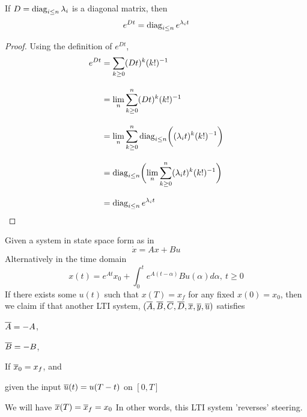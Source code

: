 \documentclass[../../main.tex]{subfiles}
\begin{document}
    \begin{lemma}\label{lemma: diagonal exponential matrix}
    If $D =\operatorname{diag}_{i\leq n}\lambda_i$ is a diagonal matrix, then 
    \[
    e^{Dt} = \operatorname{diag}_{i\leq n}e^{\lambda_i t}
    \]
\end{lemma}
\begin{proof}
    Using the definition of $e^{Dt}$,
    \begin{align*}
        e^{Dt}&= \sum_{k\geq 0} (Dt)^k(k!)^{-1}\\[2ex]
        &=\lim_n\sum^n_{k\geq 0}(Dt)^k(k!)^{-1}\\[2ex]
        &=\lim_n \sum^n_{k\geq 0}\operatorname{diag}_{i\leq n}\biggl( (\lambda_i t)^k(k!)^{-1}\biggr)\\[2ex]
        &=\operatorname{diag}_{i\leq n}\biggl(\lim_n \sum_{k\geq 0}^n (\lambda_it)^k(k!)^{-1}\biggr)\\[2ex]
        &=\operatorname{diag}_{i\leq n}e^{\lambda_i t}
    \end{align*}
\end{proof}
\begin{wts}
    Given a system in state space form as in
    \begin{equation}\label{state space equation q2}
        \dot{x} = Ax + Bu
    \end{equation}
    Alternatively in the time domain
    \begin{equation}\label{state space equation q2 time domain}
        x(t) = e^{At}x_0 + \int_0^t e^{A(t-\alpha)}Bu(\alpha)d\alpha,\: t\geq 0
    \end{equation}
    If there exists some $u(t)$ such that $x(T) = x_f$ for any fixed $x(0) = x_0$, then we claim if that another LTI system, $(\overline{A}, \overline{B}, \overline{C}, \overline{D}, \overline{x}, \overline{y}, \overline{u})$ satisfies
    \begin{enumroman}
        \item $\overline{A} = -A$,\label{q2 param1}
        \item $\overline{B} = -B$,\label{q2 param2}
        \item If $\overline{x}_0 = x_f$, and\label{q2 param3}
        \item given the input $\overline{u}(t)=u(T-t)$ on $[0, T]$\label{q2 param4}
    \end{enumroman}
    We will have $\overline{x}(T) = \overline{x}_f= x_0$ In other words, this LTI system 'reverses' steering.
\end{wts}
\end{document}
